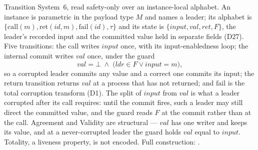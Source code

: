 \begin{definition}
  \label{def:aba-brb-spec}
  \leanok
  Transition System~6, read safety-only over an instance-local alphabet.
  An instance is parametric in the payload type $M$ and names a leader; its alphabet is $\{\mathrm{call}(m), \mathrm{ret}(id, m), \mathrm{fail}(id), \tau\}$ and its state is $\{input, val, ret, F\}$, the leader's recorded input and the committed value held in separate fields (D27).
  Five transitions: the call writes $input$ once, with its input-enabledness loop; the internal commit writes $val$ once, under the guard
  \[
    val = \bot \;\wedge\; \bigl(\mathit{ldr} \in F \vee input = m\bigr),
  \]
  so a corrupted leader commits any value and a correct one commits its input; the return transition returns $val$ at a process that has not returned; and $\mathrm{fail}$ is the total corruption transform (D1).
  The split of $input$ from $val$ is what a leader corrupted after its call requires: until the commit fires, such a leader may still direct the committed value, and the guard reads $F$ at the commit rather than at the call.
  Agreement and Validity are structural --- $val$ has one writer and keeps its value, and at a never-corrupted leader the guard holds $val$ equal to $input$.
  Totality, a liveness property, is not encoded.
  Full construction: .
\end{definition}
